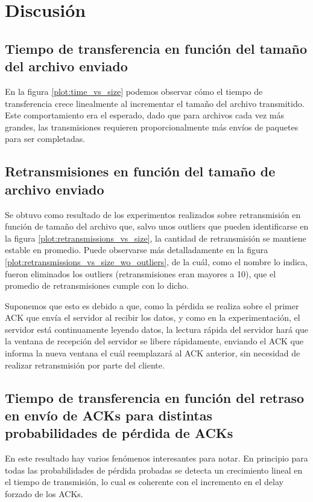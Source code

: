 \documentclass[a4paper, 10pt, twoside]{article}
\begin{document}
\section{Discusión}
\label{sec:discusion}


\subsection{Tiempo de transferencia en función del tamaño del archivo enviado}

En la figura \ref{plot:time_vs_size} podemos observar cómo el tiempo de transferencia crece linealmente al incrementar el tamaño del archivo transmitido. Este comportamiento era el esperado, dado que para archivos cada vez más grandes, las transmisiones requieren proporcionalmente más envíos de paquetes para ser completadas.


\subsection{Retransmisiones en función del tamaño de archivo enviado}

Se obtuvo como resultado de los experimentos realizados sobre retransmisión en función de tamaño del archivo que, salvo unos outliers que pueden identificarse en la figura \ref{plot:retransmissions_vs_size}, la cantidad de retransmisión se mantiene estable en promedio. Puede observarse más detalladamente en la figura \ref{plot:retransmissions_vs_size_wo_outliers}, de la cuál, como el nombre lo indica, fueron eliminados los outliers (retransmisiones eran mayores a 10), que el promedio de retransmisiones cumple con lo dicho.

Suponemos que esto es debido a que, como la pérdida se realiza sobre el primer ACK que envía el servidor al recibir los datos, y como en la experimentación, el servidor está continuamente leyendo datos, la lectura rápida del servidor hará que la ventana de recepción del servidor se libere rápidamente, enviando el ACK que informa la nueva ventana el cuál reemplazará al ACK anterior, sin necesidad de realizar retransmisión por parte del cliente.

\subsection{Tiempo de transferencia en función del retraso en envío de ACKs para distintas probabilidades de pérdida de ACKs}

En este resultado hay varios fenómenos interesantes para notar. En principio para todas las probabilidades de pérdida probadas se detecta un crecimiento lineal en el tiempo de transmisión, lo cual es coherente con el incremento en el delay forzado de los ACKs.
\end{document}
